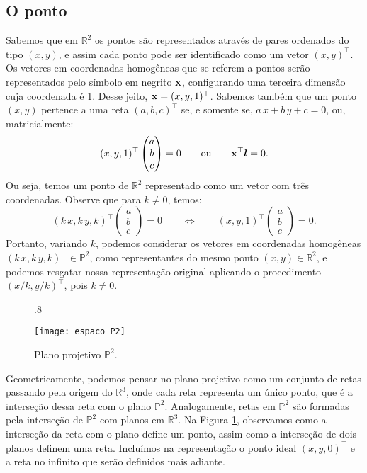 \subsection{O ponto}\label{sec.ponto}
Sabemos que em $\mathbb{R}^{2}$ os pontos são representados através de pares ordenados do tipo $(x,y)$, e assim cada ponto pode ser identificado como um vetor $(x,y)^\top$. Os vetores em coordenadas homogêneas que se referem a pontos serão representados pelo símbolo em negrito $\mathbf{x}$, configurando uma terceira dimensão cuja coordenada é 1. Desse jeito, $\mathbf{x}=(x,y,1)^\top$. Sabemos também que um ponto $(x,y)$ pertence a uma reta $(a,b,c)^\top$ se, e somente se, $a\,x+b\,y+c=0$, ou, matricialmente:
\begin{equation*}
(x,y,1)^\top 
\begin{pmatrix}
 a  \\ 
 b  \\ 
 c 
 \end{pmatrix} 
 = 0 \qquad 
 \text{ou} 
 \qquad \mathbf{x} ^\top\boldsymbol{l} = 0.
\end{equation*}
Ou seja, temos um ponto de $\mathbb{R}^{2}$ representado como um vetor com três coordenadas. Observe que para $k\neq 0$, temos:
\begin{equation*}
(k\,x,k\,y,k)^\top 
\begin{pmatrix}
 a  \\ 
 b  \\ 
 c 
 \end{pmatrix} 
 = 0
 \qquad \Leftrightarrow \qquad
 (x,y,1)^\top
\begin{pmatrix}
 a  \\ 
 b  \\ 
 c 
 \end{pmatrix} 
 = 0.
\end{equation*}
Portanto,  variando $k$, podemos considerar os vetores em coordenadas homogêneas $(k\,x,k\,y,k)^\top \in \mathbb{P}^2$, como representantes do mesmo ponto $(x,y) \in \mathbb{R}^2$, e podemos resgatar nossa representação original aplicando o procedimento $(x/k,y/k)^\top$, pois $k \ne 0$.
\begin{figure}[!htb]{.8\textwidth}
\caption{Plano projetivo $\mathbb{P}^2$.}
\texttt{[image: espaco\_P2]}
\label{plano_P2}
\end{figure}
Geometricamente, podemos pensar no plano projetivo como um conjunto de retas passando pela origem do $\mathbb{R}^3$, onde cada reta representa um único ponto, que é a interseção dessa reta com o plano $\mathbb{P}^2$. Analogamente, retas em $\mathbb{P}^2$ são formadas pela interseção de $\mathbb{P}^2$ com planos em $\mathbb{R}^3$. Na Figura \ref{plano_P2}, observamos como a interseção da reta com o plano define um ponto, assim como a interseção de dois planos definem uma reta. Inclu\'imos na representação o ponto ideal $(x,y,0)^\top$ e a reta no infinito que serão definidos mais adiante.


